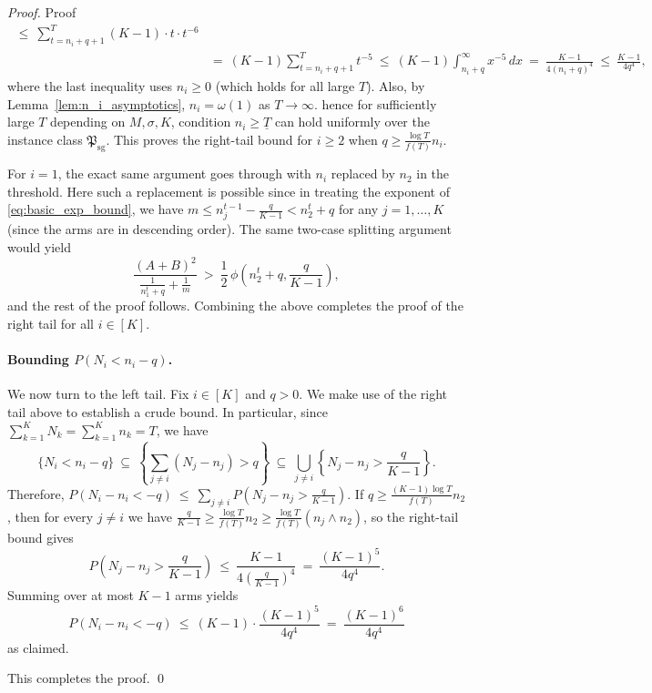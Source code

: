 \documentclass[nonblindrev]{informs3_noinforms}
\begin{document}
\begin{proof}{Proof}
\begin{align*}
\ \le\ \sum_{t=n_i+q +1}^{T}(K-1)\cdot t\cdot t^{-6}\\
&=\ (K-1)\sum_{t=n_i+q +1}^{T} t^{-5}
\ \le\ (K-1)\int_{n_i+q}^{\infty} x^{-5}\,dx
\ =\ \frac{K-1}{4(n_i+q)^4}
\ \le\ \frac{K-1}{4q^4},
\end{align*}
where the last inequality uses $n_i\ge 0$ (which holds for all large $T$). Also, by Lemma~\ref{lem:n_i_asymptotics}, $n_i = \omega(1)$ as $T \to \infty$. hence for sufficiently large $T$ depending on $M, \sigma, K$, condition $n_i  \ge \underline{T}$ can hold uniformly over the instance class $\mathfrak{P}_{\text{sg}}$. This proves the right-tail bound for $i\ge 2$ when $q\ge  \frac{\log T}{f(T)}n_i$.

For $i=1$, the exact same argument goes through with $n_i$ replaced by $n_2$ in the threshold. Here such a replacement is possible since in treating the exponent of \eqref{eq:basic_exp_bound}, we have $m \le n_j^{t-1} -\frac{q}{K-1} < n_2^{t} + q$ for any $j = 1, \dots, K$ (since the arms are in descending order). The same two-case splitting argument would yield 
\[
\frac{(A+B)^2}{\frac{1}{n_1^t + q}+\frac{1}{m}}
\ >\ \frac{1}{2}\,\phi\left(n_2^t + q, \frac{q}{K-1} \right),
\]
and the rest of the proof follows. Combining the above completes the proof of the right tail for all $i \in [K]$.

\paragraph{Bounding $P(N_i < n_i - q)$.}  We now turn to the left tail. Fix $i\in[K]$ and $q>0$. We make use of the right tail above to establish a crude bound. In particular, since $\sum_{k=1}^K N_k = \sum_{k=1}^K n_k = T$, we have
\[
\{N_i<n_i-q\}\ \subseteq\ \left\{\sum_{j\neq i}(N_j-n_j)>q\right\}
\ \subseteq\ \bigcup_{j\neq i}\left\{N_j-n_j>\frac{q}{K-1}\right\}.
\]
Therefore, $P(N_i-n_i<-q)
\ \le\ \sum_{j\neq i}P\!\left(N_j-n_j>\frac{q}{K-1}\right).$ If $q\ge \frac{(K-1)\log T}{f(T)}n_2$, then for every $j\neq i$ we have
$\frac{q}{K-1}\ge \frac{\log T}{f(T)}n_2\ge \frac{\log T}{f(T)}\left(n_j\wedge n_2\right)$, so the right-tail bound gives
\[
P\!\left(N_j-n_j>\frac{q}{K-1}\right)
\ \le\ \frac{K-1}{4\left(\frac{q}{K-1}\right)^4}
\ =\ \frac{(K-1)^5}{4q^4}.
\]
Summing over at most $K-1$ arms yields
\[
P(N_i-n_i<-q)\ \le\ (K-1)\cdot \frac{(K-1)^5}{4q^4}\ =\ \frac{(K-1)^6}{4q^4}
\]
as claimed.


This completes the proof.   \qed
\end{proof}
\end{document}
